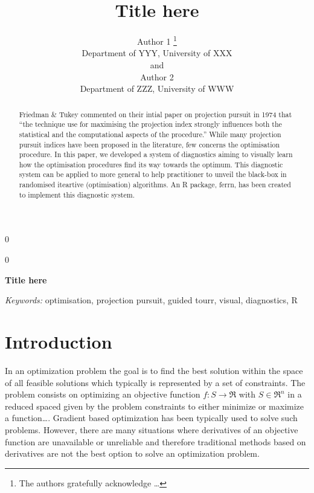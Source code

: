 \documentclass[12pt]{article}
\newcommand{\blind}{0}
\begin{document}
\def\spacingset#1{\renewcommand{\baselinestretch}%
{#1}\small\normalsize} \spacingset{1}



\blind
{
  \title{\bf Title here}

  \author{
        Author 1 \thanks{The authors gratefully acknowledge \ldots{}} \\
    Department of YYY, University of XXX\\
     and \\     Author 2 \\
    Department of ZZZ, University of WWW\\
      }
  \maketitle
} \fi

\blind
{
  \bigskip
  \bigskip
  \bigskip
  \begin{center}
    {\LARGE\bf Title here}
  \end{center}
  \medskip
} \fi

\bigskip
\begin{abstract}
Friedman \& Tukey commented on their intial paper on projection pursuit
in 1974 that ``the technique use for maximising the projection index
strongly influences both the statistical and the computational aspects
of the procedure.'' While many projection pursuit indices have been
proposed in the literature, few concerns the optimisation procedure. In
this paper, we developed a system of diagnostics aiming to visually
learn how the optimisation procedures find its way towards the optimum.
This diagnostic system can be applied to more general to help
practitioner to unveil the black-box in randomised iteartive
(optimisation) algorithms. An R package, ferrn, has been created to
implement this diagnostic system.
\end{abstract}

\noindent%
{\it Keywords:} optimisation, projection pursuit, guided tourr, visual, diagnostics, R
\vfill

\newpage
\spacingset{1.45} %

\hypertarget{introduction}{%
\section{Introduction}\label{introduction}}

In an optimization problem the goal is to find the best solution within
the space of all feasible solutions which typically is represented by a
set of constraints. The problem consists on optimizing an objective
function \(f: S \rightarrow \Re\) with \(S \in \Re^n\) in a reduced
spaced given by the problem constraints to either minimize or maximize a
function\ldots{}. Gradient based optimization has been typically used to
solve such problems. However, there are many situations where
derivatives of an objective function are unavailable or unreliable and
therefore traditional methods based on derivatives are not the best
option to solve an optimization problem.
\end{document}
